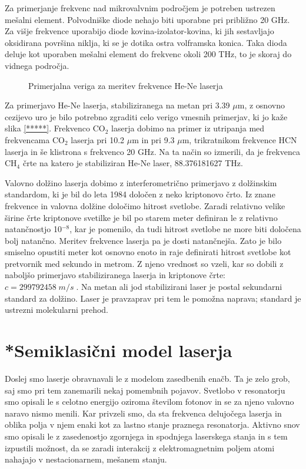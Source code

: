 Za primerjanje frekvenc nad mikrovalvnim področjem je potreben ustrezen
mešalni element. Polvodniške diode nehajo biti uporabne pri približno 20
GHz. Za višje frekvence uporabijo diode kovina-izolator-kovina, ki jih
sestavljajo oksidirana površina niklja, ki se je dotika ostra volframska
konica. Taka dioda deluje kot uporaben mešalni element do frekvenc okoli
200 THz, to je skoraj do vidnega področja.

\begin{figure}[tbp]
\label{s5.14} \vskip 15cm
\caption{Primerjalna veriga za meritev frekvence He-Ne laserja}
\end{figure}

Za primerjavo He-Ne laserja, stabiliziranega na metan pri 3.39 $\mu$m, z
osnovno cezijevo uro je bilo potrebno zgraditi celo verigo vmesnih
primerjav, ki jo kaže slika \ref{*****}. Frekvenco CO$_2$ laserja dobimo na
primer iz utripanja med frekvencama CO$_2$ laserja pri 10.2 $\mu$m in pri
9.3 $\mu$m, trikratnikom frekvence HCN laserja in še klistrona s frekvenco
20 GHz. Na ta način so izmerili, da je frekvenca CH$_4$ črte na katero je
stabiliziran He-Ne laser, 88.376181627 THz.

Valovno dolžino laserja dobimo z interferometrično primerjavo z
dolžinskim standardom, ki je bil do leta 1984 določen z neko kriptonovo
črto. Iz znane frekvence in valovna dolžine določimo hitrost svetlobe.
Zaradi relativno velike širine črte kriptonove svetilke je bil po starem
meter definiran le z relativno natančnostjo 10$^{- 8}$, kar je pomenilo, da
tudi hitrost svetlobe ne more biti določena bolj natančno. Meritev
frekvence laserja pa je dosti natančnejša. Zato je bilo smiselno opustiti
meter kot osnovno enoto in raje definirati hitrost svetlobe kot pretvornik
med sekundo in metrom. Z njeno vrednost so vzeli, kar so dobili z naboljšo
primerjavo stabiliziranega laserja in kriptonove črte: $c=299 792
458\;m/s\;. $ Na metan ali jod stabilizirani laser je postal sekundarni
standard za dolžino. Laser je pravzaprav pri tem le pomožna naprava;
standard je ustrezni molekularni prehod.
\newpage
\section{*Semiklasični model laserja}
\label{chap:semiklasicni}
Doslej smo laserje obravnavali le z modelom zasedbenih enačb. Ta je zelo
grob, saj smo pri tem zanemarili nekaj pomembnih pojavov. Svetlobo v 
resonatorju smo opisali le s celotno energijo oziroma številom fotonov in se za
njeno valovno naravo nismo menili. Kar privzeli smo, da sta frekvenca
delujočega laserja in oblika polja v njem enaki kot za lastno stanje
praznega resonatorja. Aktivno snov smo opisali le z zasedenostjo zgornjega
in spodnjega laserskega stanja in s tem izpustili možnost, da se zaradi
interakcij z elektromagnetnim poljem atomi nahajajo v nestacionarnem,
mešanem stanju.

